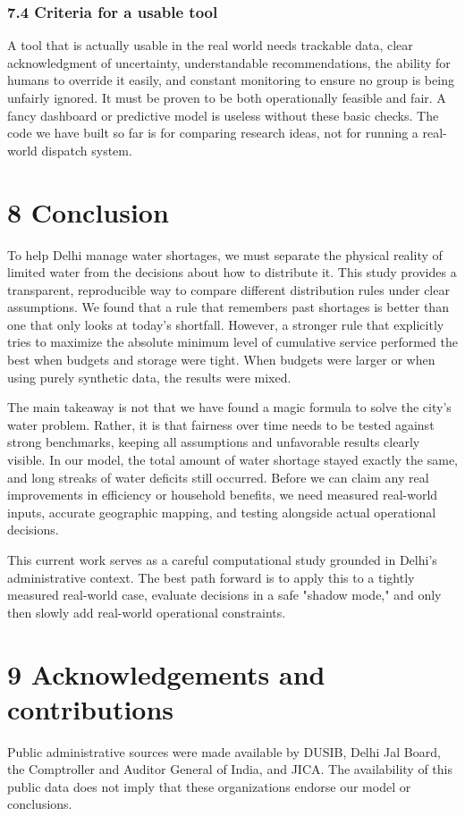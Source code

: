 \documentclass[conference]{IEEEtran}
\begin{document}
\subsubsection{7.4 Criteria for a usable tool}
A tool that is actually usable in the real world needs trackable data, clear acknowledgment of uncertainty, understandable recommendations, the ability for humans to override it easily, and constant monitoring to ensure no group is being unfairly ignored. It must be proven to be both operationally feasible and fair. A fancy dashboard or predictive model is useless without these basic checks. The code we have built so far is for comparing research ideas, not for running a real-world dispatch system.

\section{8 Conclusion}
To help Delhi manage water shortages, we must separate the physical reality of limited water from the decisions about how to distribute it. This study provides a transparent, reproducible way to compare different distribution rules under clear assumptions. We found that a rule that remembers past shortages is better than one that only looks at today's shortfall. However, a stronger rule that explicitly tries to maximize the absolute minimum level of cumulative service performed the best when budgets and storage were tight. When budgets were larger or when using purely synthetic data, the results were mixed.

The main takeaway is not that we have found a magic formula to solve the city's water problem. Rather, it is that fairness over time needs to be tested against strong benchmarks, keeping all assumptions and unfavorable results clearly visible. In our model, the total amount of water shortage stayed exactly the same, and long streaks of water deficits still occurred. Before we can claim any real improvements in efficiency or household benefits, we need measured real-world inputs, accurate geographic mapping, and testing alongside actual operational decisions.

This current work serves as a careful computational study grounded in Delhi's administrative context. The best path forward is to apply this to a tightly measured real-world case, evaluate decisions in a safe "shadow mode," and only then slowly add real-world operational constraints.

\section{9 Acknowledgements and contributions}
Public administrative sources were made available by DUSIB, Delhi Jal Board, the Comptroller and Auditor General of India, and JICA. The availability of this public data does not imply that these organizations endorse our model or conclusions.
\end{document}
